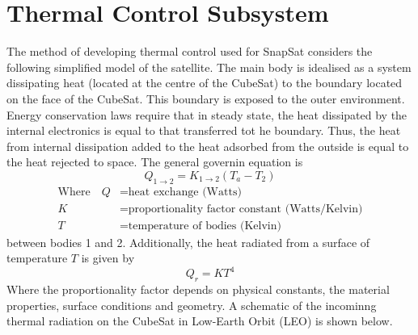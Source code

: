 \section{Thermal Control Subsystem}
The method of developing thermal control used for SnapSat considers the following simplified model of the satellite. The main body is idealised as a system dissipating heat (located at the centre of the CubeSat) to the boundary located on the face of the CubeSat. This boundary is exposed to the outer environment. Energy conservation laws require that in steady state, the heat dissipated by the internal electronics is equal to that transferred tot he boundary. Thus, the heat from internal dissipation added to the heat adsorbed from the outside is equal to the heat rejected to space. The general governin equation is
\[ Q_{1\rightarrow2} = K_{1\rightarrow2}(T_a - T_2) \]
\noindent
\begin{align}
    \text{Where}\quad Q &= \text{heat exchange (Watts)} \nonumber\\
    K &= \text{proportionality factor constant (Watts/Kelvin)} \nonumber\\
    T &= \text{temperature of bodies (Kelvin)} \nonumber
\end{align}
\noindent
between bodies 1 and 2. Additionally, the heat radiated from a surface of temperature $T$ is given by 
\[ Q_r = KT^4 \]
\noindent
Where the proportionality factor depends on physical constants, the material properties, surface conditions and geometry. A schematic of the incominng thermal radiation on the CubeSat in Low-Earth Orbit (LEO) is shown below.
\begin{figure}[H]
\end{figure}